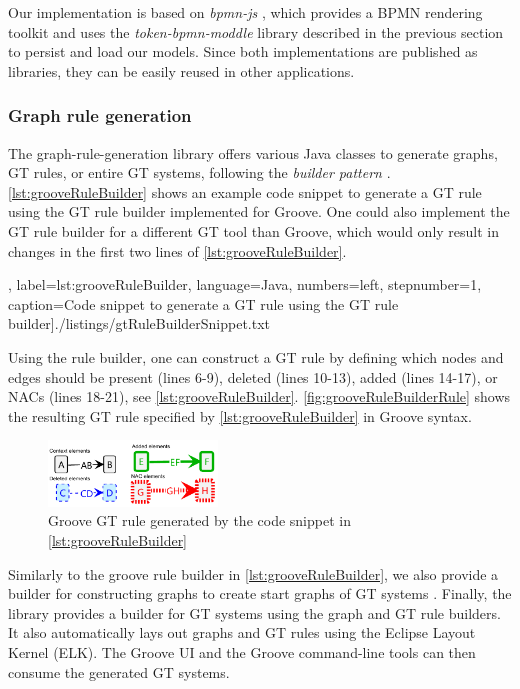 \documentclass{lmcs} %
\begin{document}
Our implementation is based on \textit{bpmn-js} \cite{camundaservicesgmbhBpmnjs2023}, which provides a BPMN rendering toolkit and uses the \textit{token-bpmn-moddle} library described in the previous section to persist and load our models.
Since both implementations are published as libraries, they can be easily reused in other applications.

\subsubsection{Graph rule generation}
The graph-rule-generation library offers various Java classes to generate graphs, GT rules, or entire GT systems, following the \textit{builder pattern} \cite{gammaDesignPatternsElements1995}.
\autoref{lst:grooveRuleBuilder} shows an example code snippet to generate a GT rule using the GT rule builder implemented for Groove.
One could also implement the GT rule builder for a different GT tool than Groove, which would only result in changes in the first two lines of \autoref{lst:grooveRuleBuilder}.

\smaller\ttfamily, label=lst:grooveRuleBuilder, language=Java, numbers=left,
    stepnumber=1, caption=Code snippet to generate a GT rule using the GT rule builder]{./listings/gtRuleBuilderSnippet.txt}

Using the rule builder, one can construct a GT rule by defining which nodes and edges should be present (lines 6-9), deleted (lines 10-13), added (lines 14-17), or NACs (lines 18-21), see \autoref{lst:grooveRuleBuilder}.
\autoref{fig:grooveRuleBuilderRule} shows the resulting GT rule specified by \autoref{lst:grooveRuleBuilder} in Groove syntax.

\begin{figure}[ht]
    \centering
    \includegraphics[width=0.4\textwidth]{images/generated_rule.pdf}
    \caption{Groove GT rule generated by the code snippet in \autoref{lst:grooveRuleBuilder}}
    \label{fig:grooveRuleBuilderRule}
\end{figure}

Similarly to the groove rule builder in \autoref{lst:grooveRuleBuilder}, we also provide a builder for constructing graphs to create start graphs of GT systems \cite{timkrauterLMCS2024Artifacts2023}.
Finally, the library provides a builder for GT systems using the graph and GT rule builders.
It also automatically lays out graphs and GT rules using the Eclipse Layout Kernel (ELK).
The Groove UI and the Groove command-line tools can then consume the generated GT systems.
\end{document}
